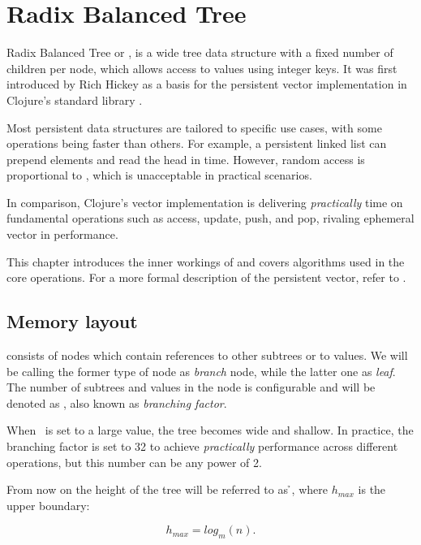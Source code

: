 \chapter{Radix Balanced Tree}

Radix Balanced Tree or \rbtree, is a wide tree data structure with a fixed number of children per node, which allows access to values using integer keys. It was first introduced by Rich Hickey as a basis for the persistent vector implementation in Clojure's standard library \cite{the-clojure-programming-language}. 

Most persistent data structures are tailored to specific use cases, with some operations being faster than others. For example, a persistent linked list can prepend elements and read the head in  time. However, random access is proportional to , which is unacceptable in practical scenarios. 

In comparison, Clojure's vector implementation is delivering \emph{practically}  time on fundamental operations such as access, update, push, and pop, rivaling ephemeral vector in performance.

This chapter introduces the inner workings of \rbtree{} and covers algorithms used in the core operations. For a more formal description of the persistent vector, refer to \cite{improving-performance-through-transience}. 

\section{Memory layout}
\label{sec:rb-tree-memory-layout}

\rbtree{} consists of nodes which contain references to other subtrees or to values. We will be calling the former type of node as \emph{branch} node, while the latter one as \emph{leaf}. The number of subtrees and values in the node is configurable and will be denoted as \m, also known as \emph{branching factor}. 

When \m\ is set to a large value, the tree becomes wide and shallow. In practice, the branching factor is set to 32 to achieve \emph{practically}  performance across different operations, but this number can be any power of 2.

From now on the height of the tree will be referred to as \h{}, where $h_{max}$ is the upper boundary:

\begin{equation}
    h_{max} = log_m(n).
\end{equation}

